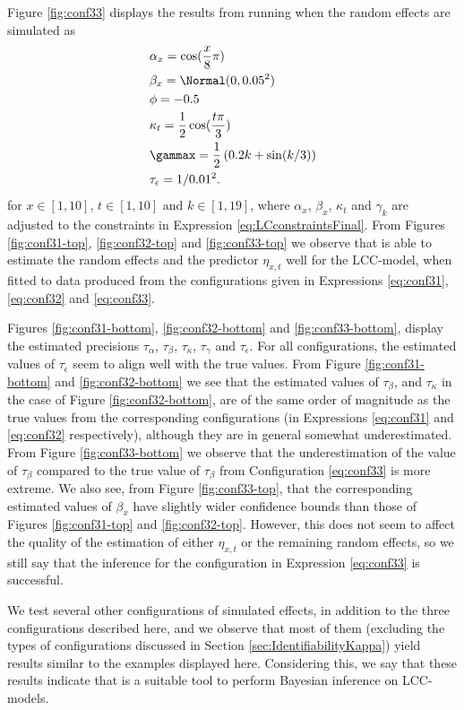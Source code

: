 Figure \ref{fig:conf33} displays the results from running \inlabru when the random effects are simulated as
\begin{equation}
    \begin{aligned}
        &\alpha_x = \cos(\frac{x}{8}\pi)\\
        &\beta_x = \Normal(0,0.05^2)\\
        &\phi = -0.5\\
        &\kappa_t = \frac{1}{2}\cos(\frac{t\pi}{3})\\
        &\gammax = \frac{1}{2}\left( 0.2k + \sin(k/3)\right)\\
        &\tau_{\epsilon} = 1/0.01^2.
    \end{aligned}
    \label{eq:conf33}
\end{equation}
for $x\in[1,10]$, $t \in [1,10]$ and $k \in [1,19]$, where $\alpha_x$, $\beta_x$, $\kappa_t$ and $\gamma_k$ are adjusted to the constraints in Expression \ref{eq:LCconstraintsFinal}. From Figures \ref{fig:conf31-top}, \ref{fig:conf32-top} and \ref{fig:conf33-top} we observe that \inlabru is able to estimate the random effects and the predictor $\eta_{x,t}$ well for the LCC-model, when fitted to data produced from the configurations given in Expressions \ref{eq:conf31}, \ref{eq:conf32} and \ref{eq:conf33}. 

\newpar Figures \ref{fig:conf31-bottom}, \ref{fig:conf32-bottom} and \ref{fig:conf33-bottom}, display the estimated precisions $\tau_\alpha$, $\tau_\beta$, $\tau_\kappa$, $\tau_\gamma$ and $\tau_\epsilon$. For all configurations, the estimated values of $\tau_\epsilon$ seem to align well with the true values. From Figure \ref{fig:conf31-bottom} and \ref{fig:conf32-bottom} we see that the estimated values of $\tau_\beta$, and $\tau_\kappa$ in the case of Figure \ref{fig:conf32-bottom}, are of the same order of magnitude as the true values from the corresponding configurations (in Expressions \ref{eq:conf31} and \ref{eq:conf32} respectively), although they are in general somewhat underestimated. From Figure \ref{fig:conf33-bottom} we observe that the underestimation of the value of $\tau_\beta$ compared to the true value of $\tau_\beta$ from Configuration \ref{eq:conf33} is more extreme. We also see, from Figure \ref{fig:conf33-top}, that the corresponding estimated values of $\beta_x$ have slightly wider confidence bounds than those of Figures \ref{fig:conf31-top} and \ref{fig:conf32-top}. However, this does not seem to affect the quality of the estimation of either $\eta_{x,t}$ or the remaining random effects, so we still say that the inference for the configuration in Expression \ref{eq:conf33} is successful. 

\newpar We test several other configurations of simulated effects, in addition to the three configurations described here, and we observe that most of them (excluding the types of configurations discussed in Section \ref{sec:IdentifiabilityKappa}) yield results similar to the examples displayed here. Considering this, we say that these results indicate that \inlabru is a suitable tool to perform Bayesian inference on LCC-models. 

